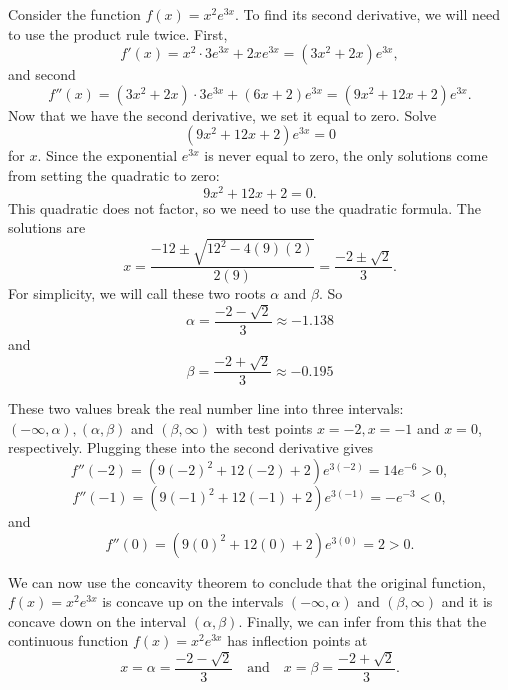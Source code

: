 \documentclass{ximera}
\begin{document}
\begin{example}[example 6]
Consider the function $f(x) = x^2e^{3x}$.  To find its second derivative, 
we will need to use the product rule twice. First, 
\[f'(x) = x^2 \cdot 3e^{3x} + 2xe^{3x} = (3x^2 + 2x)e^{3x},\]
and second
\[f''(x) = (3x^2 + 2x)\cdot 3e^{3x} + (6x + 2)e^{3x} = (9x^2 + 12x + 2)e^{3x}.\]
Now that we have the second derivative, we set it equal to zero.  Solve
\[(9x^2 + 12x + 2)e^{3x}=0\]
for $x$.
Since the exponential $e^{3x}$ is never equal to zero, the only solutions come from setting the quadratic to zero:
\[9x^2 + 12x + 2=0.\]
This quadratic does not factor, so we need to use the quadratic formula.
The solutions are 
\[x = \frac{-12 \pm \sqrt{12^2 - 4(9)(2)}}{2(9)} = \frac{-2 \pm \sqrt{2}}{3}.\]
For simplicity, we will call these two roots $\alpha$ and $\beta$.
So 
\[\alpha = \frac{-2 - \sqrt{2}}{3} \approx -1.138\]
and
\[\beta = \frac{-2 + \sqrt{2}}{3} \approx -0.195\]

These two values break the real number line into three intervals: $(-\infty, \alpha), 
(\alpha, \beta)$ and $(\beta, \infty)$ with test points
$x = -2, x = -1$ and $x = 0$, respectively.
Plugging these into the second derivative gives
\[f''(-2) = (9(-2)^2 + 12(-2) + 2)e^{3(-2)} = 14e^{-6} > 0,\]
\[f''(-1) = (9(-1)^2 + 12(-1) + 2)e^{3(-1)} = -e^{-3} < 0,\]
and
\[f''(0) = (9(0)^2 + 12(0) + 2)e^{3(0)} = 2 > 0.\]



\begin{image}
\end{image}


We can now use the concavity theorem to conclude that
the original function, $f(x) = x^2 e^{3x}$ is concave up on the intervals $(-\infty, \alpha)$ 
and $(\beta, \infty)$ and it is concave down on the interval 
$(\alpha, \beta)$.
Finally, we can infer from this that the continuous function $f(x) = x^2 e^{3x}$ has inflection points at 
\[
x = \alpha= \dfrac{-2 - \sqrt{2}}{3} \quad \text{and} \quad x = \beta = \dfrac{-2 + \sqrt{2}}{3}.
\]


\end{example}
\end{document}
